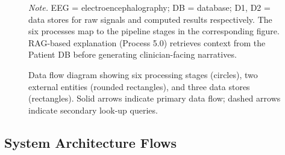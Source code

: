 \begin{figure}[!htbp]
{%
}%
\caption[Data Flow Diagram: Six Processing Stages (Appendix)]{Data flow diagram showing six processing stages (circles), two external entities (rounded rectangles), and three data stores (rectangles). Solid arrows indicate primary data flow; dashed arrows indicate secondary look-up queries.}
\label{app_fig:data_flow_diagram}

\vspace{0.5em}\noindent\textit{Note.} EEG = electroencephalography; DB = database; D1, D2 = data stores for raw signals and computed results respectively. The six processes map to the pipeline stages in the corresponding figure. RAG-based explanation (Process 5.0) retrieves context from the Patient DB before generating clinician-facing narratives.
\end{figure}

\subsection{System Architecture Flows}
\label{app_sec:system_flows}

\label{app_fig:model_flow}
\label{app_fig:hybrid_flow}
\label{app_fig:rag_flow}
\label{app_fig:gpu_deployment_flow}
\label{app_fig:pii_flow}
\label{app_fig:guardrail_flow}
\label{app_fig:statistical_flow}


